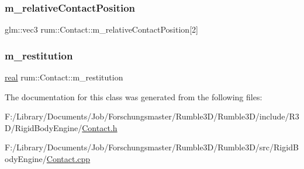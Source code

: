 \mbox{\label{classrum_1_1_contact_aae0e51d30ae3e1631dd2017ce87812ba}} 
\subsubsection{\texorpdfstring{m\+\_\+relative\+Contact\+Position}{m\_relativeContactPosition}}
{\footnotesize\ttfamily glm\+::vec3 rum\+::\+Contact\+::m\+\_\+relative\+Contact\+Position\mbox{[}2\mbox{]}\hspace{0.3cm}{\ttfamily [protected]}}

\mbox{\label{classrum_1_1_contact_a99498377d3d6b5ae69036c29fce0ff05}} 
\subsubsection{\texorpdfstring{m\+\_\+restitution}{m\_restitution}}
{\footnotesize\ttfamily \hyperlink{namespacerum_a7e8cca23573d5eaead0f138cbaa4862c}{real} rum\+::\+Contact\+::m\+\_\+restitution\hspace{0.3cm}{\ttfamily [protected]}}



The documentation for this class was generated from the following files\+:\begin{DoxyCompactItemize}
\item 
F\+:/\+Library/\+Documents/\+Job/\+Forschungsmaster/\+Rumble3\+D/\+Rumble3\+D/include/\+R3\+D/\+Rigid\+Body\+Engine/\hyperlink{_contact_8h}{Contact.\+h}\item 
F\+:/\+Library/\+Documents/\+Job/\+Forschungsmaster/\+Rumble3\+D/\+Rumble3\+D/src/\+Rigid\+Body\+Engine/\hyperlink{_contact_8cpp}{Contact.\+cpp}\end{DoxyCompactItemize}

